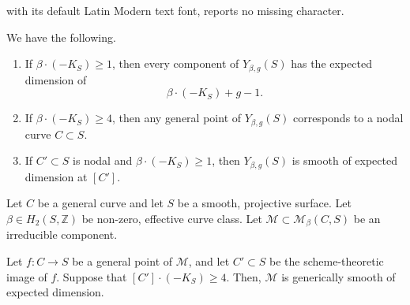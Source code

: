 \documentclass[10pt,a4paper]{amsart}
\def\cM{{\mathcal{M}}}
\begin{document}
with its default Latin Modern text font, reports no missing character.
\begin{theorem}\label{severi_thm}
    We have the following.
    \begin{enumerate}
     \item[(i)] If $\beta\cdot (-K_S)\ge 1$, then every component of $Y_{\beta,g}(S)$ has the expected dimension of 
     \begin{equation*}
         \beta\cdot (-K_S)+g-1.
     \end{equation*}
     \item[(ii)] If $\beta\cdot (-K_S)\ge 4$, then any general point of $Y_{\beta,g}(S)$ corresponds to a nodal curve $C\subset S$.
     \item[(iii)] If $C'\subset S$ is nodal and $\beta\cdot (-K_S)\ge 1$, then $Y_{\beta,g}(S)$ is smooth of expected dimension at $[C']$.
     \end{enumerate}
\end{theorem}

 \begin{proposition}\label{prop:multiple covers}
 Let $C$ be a general curve and let $S$ be a smooth, projective surface. Let $\beta\in H_2(S,\mathbb{Z})$ be non-zero, effective curve class. Let $\cM\subset \cM_\beta(C,S)$ be an irreducible component.

 Let $f:C\to S$ be a general point of $\cM$, and let $C'\subset S$ be the scheme-theoretic image of $f$. Suppose that $[C']\cdot (-K_S) \ge 4$. Then, $\cM$ is generically smooth of expected dimension.
 \end{proposition}
\end{document}
